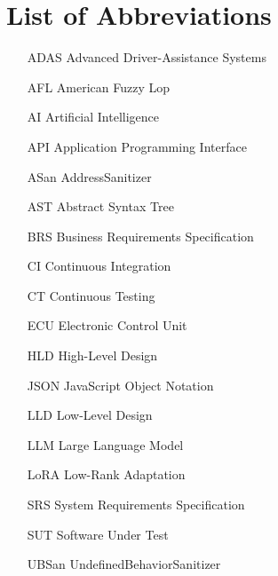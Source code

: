  


\tableofcontents

\cleardoublepage
{}
{}
\listoffigures

\cleardoublepage
{}
{}
\listoftables

\cleardoublepage
{}
{}
\chapter*{List of Abbreviations}
\begin{itemize}
    \item[ADAS] Advanced Driver-Assistance Systems
    \item[AFL] American Fuzzy Lop
    \item[AI] Artificial Intelligence
    \item[API] Application Programming Interface
    \item[ASan] AddressSanitizer
    \item[AST] Abstract Syntax Tree
    \item[BRS] Business Requirements Specification
    \item[CI] Continuous Integration
    \item[CT] Continuous Testing
    \item[ECU] Electronic Control Unit
    \item[HLD] High-Level Design
    \item[JSON] JavaScript Object Notation
    \item[LLD] Low-Level Design
    \item[LLM] Large Language Model
    \item[LoRA] Low-Rank Adaptation
    \item[SRS] System Requirements Specification
    \item[SUT] Software Under Test
    \item[UBSan] UndefinedBehaviorSanitizer
\end{itemize}

\mainmatter

